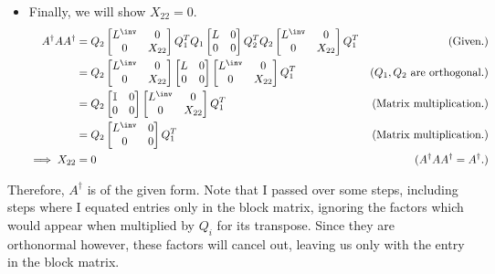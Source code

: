 \begin{solution}
\begin{itemize}
        \item Finally, we will show $X_{22} = 0$.
        \alignbreak
        \begin{align}
            A^\dag AA^\dag &= Q_2\begin{bmatrix}L^\inv &0 \\ 0 &X_{22}\end{bmatrix}Q_1^TQ_1 \begin{bmatrix}L &0\\ 0 &0\end{bmatrix}Q_2^TQ_2 \begin{bmatrix}L^\inv &0 \\0 &X_{22}\end{bmatrix}Q_1^T &\text{(Given.)}\nonumber\\
            &= Q_2\begin{bmatrix}L^\inv &0 \\ 0 &X_{22}\end{bmatrix} \begin{bmatrix}L &0\\ 0&0\end{bmatrix} \begin{bmatrix}L^\inv &0 \\0 &X_{22}\end{bmatrix}Q_1^T &\text{($Q_1, Q_2$ are orthogonal.)}\nonumber\\
            &= Q_2\begin{bmatrix}\id &0\\0&0\end{bmatrix}\begin{bmatrix}L^\inv &0 \\ 0&X_{22}\end{bmatrix}Q_1^T &\text{(Matrix multiplication.)}\nonumber\\
            &= Q_2\begin{bmatrix}L^\inv &0 \\0&0\end{bmatrix}Q_1^T &\text{(Matrix multiplication.)}\nonumber\\
            \implies X_{22} &= 0 &(A^\dag AA^\dag = A^\dag.) \nonumber
        \end{align}
        \alignbreak
    \end{itemize}

    Therefore, $A^\dag$ is of the given form. Note that I passed over some steps, including steps where I equated entries only in the block matrix, ignoring the factors which would appear when multiplied by $Q_i$ for its transpose. Since they are orthonormal however, these factors will cancel out, leaving us only with the entry in the block matrix. 
\end{solution}

